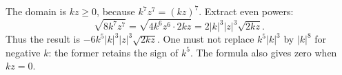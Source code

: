 The domain is $kz\ge0$, because $k^7z^7=(kz)^7$. Extract even powers:\[\sqrt{8k^7z^7}=\sqrt{4k^6z^6\cdot2kz}=2|k|^3|z|^3\sqrt{2kz}.\]Thus the result is $\boxed{-6k^5|k|^3|z|^3\sqrt{2kz}}$. One must not replace $k^5|k|^3$ by $|k|^8$ for negative $k$: the former retains the sign of $k^5$. The formula also gives zero when $kz=0$.
